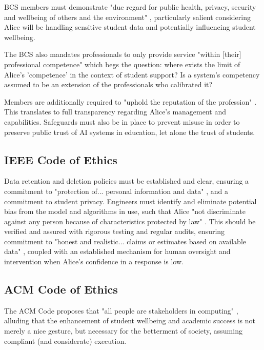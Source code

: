 \documentclass[14pt,a4paper]{article}
\begin{document}
\begin{multicols}{2}
BCS members must demonstrate "due regard for public health, privacy, security and wellbeing of others and the environment" \textit{\parencite[p. 2]{BCS2024}}, particularly salient considering Alice will be handling sensitive student data and potentially influencing student wellbeing.

The BCS also mandates professionals to only provide service "within [their] professional competence" \textit{\parencite[p. 2]{BCS2024}} which begs the question: where exists the limit of Alice's 'competence' in the context of student support? Is a system's competency assumed to be an extension of the professionals who calibrated it?

Members are additionally required to "uphold the reputation of the profession" \textit{\parencite[p. 3]{BCS2024}}. This translates to full transparency regarding Alice's management and capabilities. Safeguards must also be in place to prevent misuse in order to preserve public trust of AI systems in education, let alone the trust of students.

\subsection{IEEE Code of Ethics}


Data retention and deletion policies must be established and clear, ensuring a commitment to "protection of... personal information and data" \textit{\parencite[p. 1]{IEEE2024}}, and a commitment to student privacy.
Engineers must identify and eliminate potential bias from the model and algorithms in use, such that Alice "not discriminate against any person because of characteristics protected by law" \textit{\parencite[p. 1]{IEEE2024}}.
This should be verified and assured with rigorous testing and regular audits, ensuring commitment to "honest and realistic... claims or estimates based on available data" \textit{\parencite[p. 2]{IEEE2024}}, coupled with an established mechanism for human oversight and intervention when Alice's confidence in a response is low.

\subsection{ACM Code of Ethics}

The ACM Code proposes that "all people are stakeholders in computing" \textit{\parencite[p. 1]{ACM2024}}, alluding that the enhancement of student wellbeing and academic success is not merely a nice gesture, but necessary for the betterment of society, assuming compliant (and considerate) execution.


\end{multicols}
\end{document}
